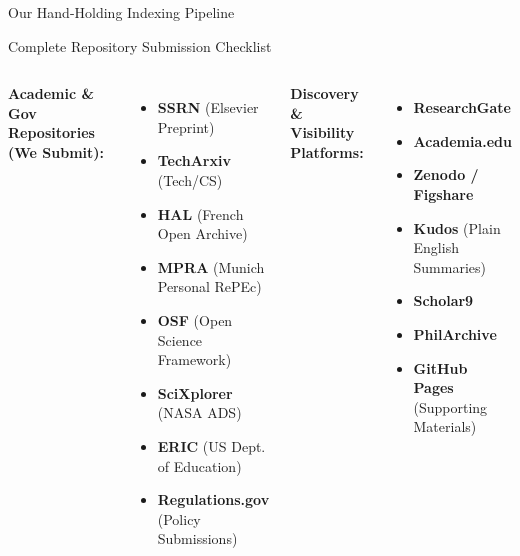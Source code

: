 \documentclass[10pt, aspectratio=169]{beamer}
\begin{document}
\begin{frame}{Our Hand-Holding Indexing Pipeline}
		\vspace{0.3cm}
		\begin{center}
		\end{center}
	\end{frame}
	
	\begin{frame}{Complete Repository Submission Checklist}
		\begin{columns}[T]
			\textbf{Academic \& Gov Repositories (We Submit):}
			\begin{itemize}
				\item[\textcolor{mygreen}{\checkmark}] \textbf{SSRN} (Elsevier Preprint)
				\item[\textcolor{mygreen}{\checkmark}] \textbf{TechArxiv} (Tech/CS)
				\item[\textcolor{mygreen}{\checkmark}] \textbf{HAL} (French Open Archive)
				\item[\textcolor{mygreen}{\checkmark}] \textbf{MPRA} (Munich Personal RePEc)
				\item[\textcolor{mygreen}{\checkmark}] \textbf{OSF} (Open Science Framework)
				\item[\textcolor{mygreen}{\checkmark}] \textbf{SciXplorer} (NASA ADS)
				\item[\textcolor{mygreen}{\checkmark}] \textbf{ERIC} (US Dept. of Education)
				\item[\textcolor{mygreen}{\checkmark}] \textbf{Regulations.gov} (Policy Submissions)
			\end{itemize}
			
			\textbf{Discovery \& Visibility Platforms:}
			\begin{itemize}
				\item[\textcolor{mygreen}{\checkmark}] \textbf{ResearchGate}
				\item[\textcolor{mygreen}{\checkmark}] \textbf{Academia.edu}
				\item[\textcolor{mygreen}{\checkmark}] \textbf{Zenodo / Figshare}
				\item[\textcolor{mygreen}{\checkmark}] \textbf{Kudos} (Plain English Summaries)
				\item[\textcolor{mygreen}{\checkmark}] \textbf{Scholar9}
				\item[\textcolor{mygreen}{\checkmark}] \textbf{PhilArchive}
				\item[\textcolor{mygreen}{\checkmark}] \textbf{GitHub Pages} (Supporting Materials)
			\end{itemize}
		\end{columns}
		

\end{frame}
\end{document}
